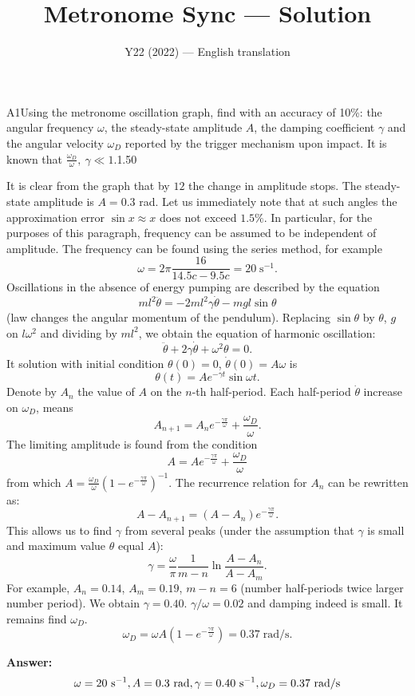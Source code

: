 \documentclass[11pt,a4paper]{article}
\title{\textbf{Metronome Sync --- Solution}}
\author{\normalsize Y22 (2022) — English translation}
\date{}
\begin{document}
\maketitle\vspace{-0.5em}
\begin{solcard}{A1}{Using the metronome oscillation graph, find with an accuracy of 10\%: the angular frequency $\omega$, the steady-state amplitude $A$, the damping coefficient $\gamma$ and the angular velocity $\omega_D$ reported by the trigger mechanism upon impact. It is known that $\frac{\omega_D}\omega,\ \gamma\ll1$.}{1.50}

It is clear from the graph that by $12$ the change in amplitude stops. The steady-state amplitude is $A=0.3$ rad. Let us immediately note that at such angles the approximation error $\sin x \approx x$ does not exceed $1.5\%$. In particular, for the purposes of this paragraph, frequency can be assumed to be independent of amplitude. The frequency can be found using the series method, for example $$ \omega = 2\pi \frac{16}{14.5c - 9.5c} = 20\; \text{s}^{-1}. $$Oscillations in the absence of energy pumping are described by the equation $$ ml^2\ddot{\theta} = -2ml^2\gamma\dot{\theta} - mgl \sin \theta $$    (law changes the angular momentum of the pendulum). Replacing $\sin\theta$ by $\theta$, $g$ on $l\omega^2$ and dividing by $ml^2$, we obtain the equation of harmonic oscillation: $$ \ddot{\theta} + 2\gamma \dot{\theta} + \omega^2 \theta = 0. $$    It solution with initial condition $\theta(0) = 0$, $\dot{\theta}(0) = A\omega$ is $$ \theta(t) = A e^{-\gamma t} \sin \omega t. $$    Denote by $A_n$ the value of $A$ on the $n$-th half-period. Each half-period $\dot {\theta}$ increase on $\omega_D$, means $$ A_{n+1} = A_n e^{-\frac{\gamma \pi}{\omega}} + \frac{\omega_D}{\omega}. $$    The limiting amplitude is found from the condition $$ A = A e^{-\frac{\gamma \pi}{\omega}} + \frac{\omega_D}{\omega} $$    from which $A = \frac{\omega_D}{\omega} \left(1 - e^{-\frac{\gamma \pi}{\omega}}\right)^{-1}$. The recurrence relation for $A_n$ can be rewritten as: $$ A - A_{n+1} = (A - A_n) e^{-\frac{\gamma \pi}{\omega}}. $$ This allows us to find $\gamma$ from several peaks (under the assumption that $\gamma$ is small and maximum value $\theta$ equal $A$): $$ \gamma = \frac{\omega}{\pi} \frac{1}{m - n} \ln \frac{A-A_n}{A-A_m}. $$    For example, $A_n = 0.14$, $A_m = 0.19$, $m - n = 6$ (number half-periods twice larger number period). We obtain $\gamma = 0.40$. $\gamma/\omega = 0.02$ and damping indeed is small. It remains find $\omega_D$. $$ \omega_D = \omega A \left(1 - e^{-\frac{\gamma \pi}{\omega}}\right) = 0.37 \; \text{rad}/\text{s}. $$

\par\smallskip\noindent\textbf{Answer:} \[\omega = 20~\text{s}^{-1},\\A=0.3~\mathrm{rad},\\\gamma = 0.40~\mathrm{s}^{-1},\\\omega_D = 0.37~\text{rad}/\text{s}\]
\end{solcard}
\end{document}
